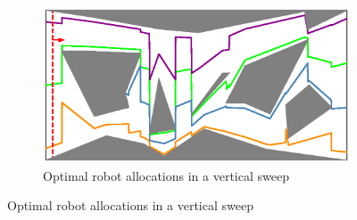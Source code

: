 \begin{figure}[t]
\vspace{1.5mm}
    \centering

    \begin{subfigure}[t]{0.477\textwidth}
         \centering
         \includegraphics[width=\textwidth]{chapters/sc/fig/instance_2.eps}
         \caption{Optimal robot allocations in a vertical sweep}
         \label{fig:vertical}
     \end{subfigure}
    
    \medskip
    

\end{figure}

